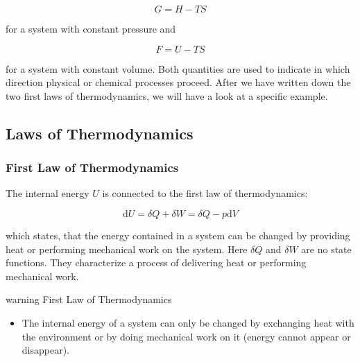 \documentclass[letterpaper,10pt,english]{sphinxmanual}
\begin{document}
\sphinxAtStartPar
{}

\sphinxAtStartPar
\begin{equation}
G=H-TS
\end{equation}

\sphinxAtStartPar
for a system with constant pressure and

\sphinxAtStartPar
{}

\sphinxAtStartPar
\begin{equation}
F=U-TS
\end{equation}

\sphinxAtStartPar
for a system with constant volume. Both quantities are used to indicate in which direction physical or chemical processes proceed. After we have written down the two first laws of thermodynamics, we will have a look at a specific example.


\subsection{Laws of Thermodynamics}
\label{\detokenize{notebooks/L1/2_Thermodynamics_Statistics:Laws-of-Thermodynamics}}

\subsubsection{First Law of Thermodynamics}
\label{\detokenize{notebooks/L1/2_Thermodynamics_Statistics:First-Law-of-Thermodynamics}}
\sphinxAtStartPar
The internal energy \(U\) is connected to the first law of thermodynamics:

\sphinxAtStartPar
\begin{equation}
\mathrm dU=\delta Q+\delta W=\delta Q-p\mathrm dV
\end{equation}

\sphinxAtStartPar
which states, that the energy contained in a system can be changed by providing heat or performing mechanical work on the system. Here \(\delta Q\) and \(\delta W\) are no state functions. They characterize a process of delivering heat or performing mechanical work.

\begin{sphinxadmonition}{warning}{}\unskip
\sphinxAtStartPar
{} First Law of Thermodynamics
\begin{itemize}
\item {} 
\sphinxAtStartPar
The internal energy of a system can only be changed by exchanging heat with the environment or by doing mechanical work on it (energy cannot appear or disappear).

\end{itemize}
\end{sphinxadmonition}
\end{document}
